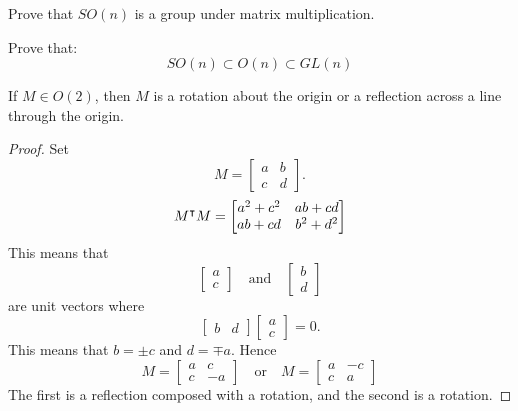 \documentclass{ximera}
\begin{document}
\begin{exercise}
  Prove that $SO(n)$ is a group under matrix multiplication.
\end{exercise}


\begin{exercise}
  Prove that:
  \[
  SO(n) \subset O(n) \subset GL(n)
  \]
\end{exercise}


\begin{theorem}
  If $M\in O(2)$, then $M$ is a rotation about the origin or a
  reflection across a line through the origin.
  \begin{proof}
    Set
    \[
    M= \begin{bmatrix}
      a & b \\
      c & d
    \end{bmatrix}.
    \]
    \[
    M^\intercal M =
    \begin{bmatrix}
      a^2+c^2 & ab+cd\\
      ab + cd & b^2+d^2
    \end{bmatrix}
    \]
    This means that
    \[
    \begin{bmatrix}
      a\\
      c
    \end{bmatrix}
    \quad\text{and}\quad
    \begin{bmatrix}
      b\\
      d
    \end{bmatrix}
    \]
    are unit vectors where
    \[
    \begin{bmatrix}
      b & d
    \end{bmatrix}
    \begin{bmatrix}
      a\\
      c
    \end{bmatrix}=0.    
    \]
    This means that $b= \pm c$ and $d = \mp a$. Hence
    \[
    M = \begin{bmatrix}
      a & c \\
      c & -a
    \end{bmatrix}
    \quad\text{or}\quad
    M = \begin{bmatrix}
      a & -c \\
      c & a
    \end{bmatrix}
    \]
    The first is a reflection composed with a rotation, and the second
    is a rotation.
  \end{proof}
\end{theorem}
\end{document}
